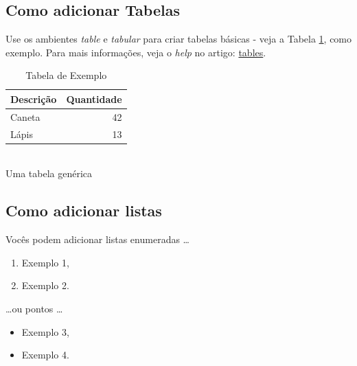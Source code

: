 \documentclass[a4paper,12pt]{article}
\begin{document}
\subsection{Como adicionar Tabelas}

Use os ambientes \textit{table} e \textit{tabular} para criar tabelas básicas - veja a Tabela \ref{tab:widgets}, como exemplo. Para mais informações, veja o \textit{help} no artigo: \href{https://www.overleaf.com/learn/latex/tables}{tables}. 

\begin{table}[h]
\centering
\caption{Tabela de Exemplo}
\begin{tabular}{|l|r|}
\hline
Descrição & Quantidade \\\hline
Caneta & 42 \\
Lápis & 13\\\hline
\end{tabular}
\\\footnotesize{Uma tabela genérica}
\label{tab:widgets}
\end{table}

\subsection{Como adicionar listas}

Vocês podem adicionar listas enumeradas \dots

\begin{enumerate}
\item Exemplo 1,
\item Exemplo 2.
\end{enumerate}
\dots ou pontos \dots
\begin{itemize}
\item Exemplo 3,
\item Exemplo 4.
\end{itemize}

\end{document}
